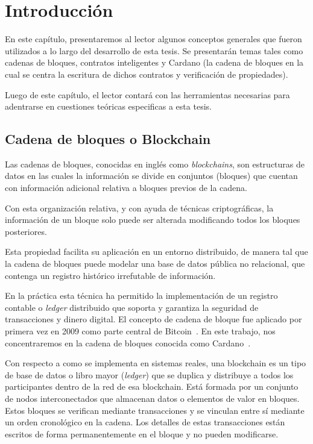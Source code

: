 \documentclass[12pt]{book}
\begin{document}
\chapter{Introducción}

En este capítulo, presentaremos al lector algunos conceptos generales que fueron utilizados a lo largo del desarrollo de esta tesis. Se presentarán temas tales como cadenas de bloques, contratos inteligentes y Cardano (la cadena de bloques en la cual se centra la escritura de dichos contratos y verificación de propiedades).

Luego de este capítulo, el lector contará con las herramientas necesarias para adentrarse en cuestiones teóricas especificas a esta tesis.

\section{Cadena de bloques o Blockchain}
Las cadenas de bloques, conocidas en inglés como \textit{blockchains}, son estructuras de datos en las cuales la información se divide en conjuntos (bloques) que cuentan con información adicional relativa a bloques previos de la cadena.

Con esta organización relativa, y con ayuda de técnicas criptográficas, la información de un bloque solo puede ser alterada modificando todos los bloques posteriores.

Esta propiedad facilita su aplicación en un entorno distribuido, de manera tal que la cadena de bloques puede modelar una base de datos pública no relacional, que contenga un registro histórico irrefutable de información.

En la práctica esta técnica ha permitido la implementación de un registro contable o \textit{ledger} distribuido que soporta y garantiza la seguridad de transacciones y dinero digital.
El concepto de cadena de bloque fue aplicado por primera vez en 2009 como parte central de Bitcoin~\cite{nakamoto2008bitcoin}. En este trabajo, nos concentraremos en la cadena de bloques conocida como Cardano~\cite{cardano_website,cardano_utxo_ledger}.

Con respecto a como se implementa en sistemas reales, una blockchain es un tipo de base de datos o libro mayor (\textit{ledger}) que se duplica y distribuye a todos los participantes dentro de la red de esa blockchain. Está formada por un conjunto de nodos interconectados que almacenan datos o elementos de valor en bloques. Estos bloques se verifican mediante transacciones y se vinculan entre sí mediante un orden cronológico en la cadena. Los detalles de estas transacciones están escritos de forma permanentemente en el bloque y no pueden modificarse.
\end{document}
